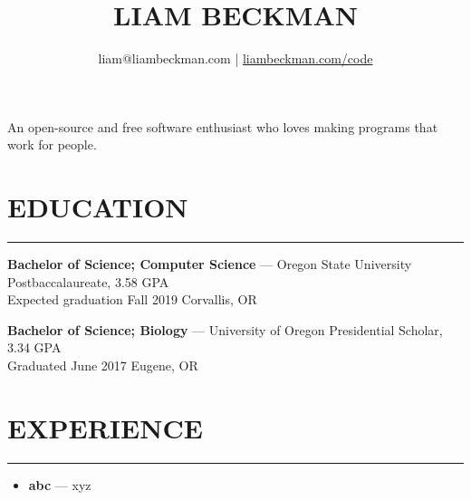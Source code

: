 


\title{\textcolor{my-red}{LIAM BECKMAN}}
\author{liam@liambeckman.com | \href{https://liambeckman.com/code}{liambeckman.com/code}}

\date{\vspace{-5ex}}



\maketitle

\begin{center}
An open-source and free software enthusiast who loves making programs that work for people.
\end{center}

\newcommand{\myTitle}[1] {
    \vspace{-1.5em}
    \section*{\large{#1}}\vspace{-1.7em}
    \textcolor{my-grey}{\rule{\linewidth}{0.5pt}}
    \vspace{-1em}
}

\newcommand{\showoff}[4] {
    \textcolor{my-blue}{\textbf{#1}} --- #2\\
    \textcolor{my-grey}{#3 \hfill #4}
    \medskip
}

\newcommand{\myBreak} {
    \textcolor{my-grey}{\dotfill}
    \smallskip
}

\newcommand{\myItem}[1] {
    \item\textcolor{my-blue}{\textbf{#1}} ---
}

\myTitle{EDUCATION}

\showoff{Bachelor of Science; Computer Science}{Oregon State University Postbaccalaureate, 3.58 GPA}{Expected graduation Fall 2019}{Corvallis, OR}

\myBreak

\showoff{Bachelor of Science; Biology}{University of Oregon Presidential Scholar, 3.34 GPA}{Graduated June 2017}{Eugene, OR}

\medbreak

\myTitle{EXPERIENCE}

\vspace{-1em}
\begin{itemize}[label=\triangleright]
    \myItem{abc}xyz
\end{itemize}

